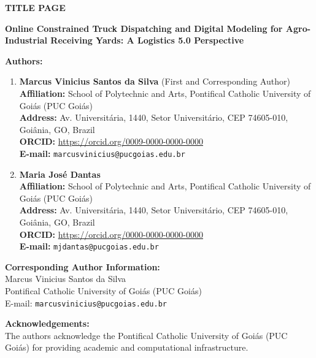 \documentclass[12pt,a4paper]{article}
\begin{document}
\begin{center}
  {\Large\bfseries TITLE PAGE\par}
  \vspace{1.5em}
  {\large\bfseries Online Constrained Truck Dispatching and Digital Modeling for Agro-Industrial Receiving Yards: A Logistics 5.0 Perspective\par}
\end{center}

\vspace{2em}

\noindent\textbf{Authors:}
\begin{enumerate}[leftmargin=1.2cm,itemsep=0.8em]
  \item \textbf{Marcus Vinicius Santos da Silva} (First and Corresponding Author)\\
  \textbf{Affiliation:} School of Polytechnic and Arts, Pontifical Catholic University of Goi{\'a}s (PUC Goi{\'a}s)\\
  \textbf{Address:} Av. Universit{\'a}ria, 1440, Setor Universit{\'a}rio, CEP 74605-010, Goi{\^a}nia, GO, Brazil\\
  \textbf{ORCID:} \url{https://orcid.org/0009-0000-0000-0000}\\
  \textbf{E-mail:} \texttt{marcusvinicius@pucgoias.edu.br}

  \item \textbf{Maria Jos{\'e} Dantas}\\
  \textbf{Affiliation:} School of Polytechnic and Arts, Pontifical Catholic University of Goi{\'a}s (PUC Goi{\'a}s)\\
  \textbf{Address:} Av. Universit{\'a}ria, 1440, Setor Universit{\'a}rio, CEP 74605-010, Goi{\^a}nia, GO, Brazil\\
  \textbf{ORCID:} \url{https://orcid.org/0000-0000-0000-0000}\\
  \textbf{E-mail:} \texttt{mjdantas@pucgoias.edu.br}
\end{enumerate}

\vspace{1.5em}

\noindent\textbf{Corresponding Author Information:}\\
Marcus Vinicius Santos da Silva\\
Pontifical Catholic University of Goi{\'a}s (PUC Goi{\'a}s)\\
E-mail: \texttt{marcusvinicius@pucgoias.edu.br}

\vspace{1.5em}

\noindent\textbf{Acknowledgements:}\\
The authors acknowledge the Pontifical Catholic University of Goi{\'a}s (PUC Goi{\'a}s) for providing academic and computational infrastructure.
\end{document}
